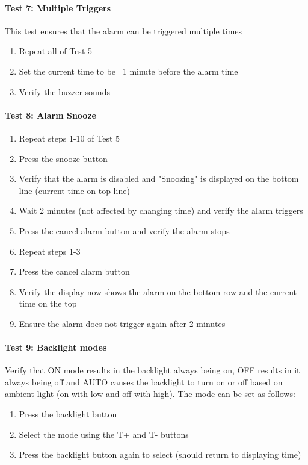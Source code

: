 \documentclass{article}
\begin{document}
\paragraph{Test 7: Multiple Triggers} This test ensures that the alarm can be triggered multiple times
\begin{enumerate}
    \item Repeat all of Test 5
    \item Set the current time to be ~1 minute before the alarm time
    \item Verify the buzzer sounds
\end{enumerate}

\paragraph{Test 8: Alarm Snooze}
\begin{enumerate}
    \item Repeat steps 1-10 of Test 5
    \item Press the snooze button
    \item Verify that the alarm is disabled and "Snoozing" is displayed on the bottom line (current time on top line)
    \item Wait 2 minutes (not affected by changing time) and verify the alarm triggers
    \item Press the cancel alarm button and verify the alarm stops
    \item Repeat steps 1-3
    \item Press the cancel alarm button
    \item Verify the display now shows the alarm on the bottom row and the current time on the top
    \item Ensure the alarm does not trigger again after 2 minutes
\end{enumerate}


\paragraph{Test 9: Backlight modes} Verify that ON mode results in the backlight always being on, OFF results in it always being off and AUTO causes the backlight to turn on or off based on ambient light (on with low and off with high). The mode can be set as follows:
\begin{enumerate}
    \item Press the backlight button
    \item Select the mode using the T+ and T- buttons
    \item Press the backlight button again to select (should return to displaying time)
\end{enumerate}
\end{document}
